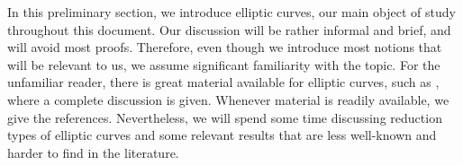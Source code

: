
In this preliminary section, we introduce elliptic curves, our main object of study throughout this document. Our discussion will be rather informal and brief, and will avoid most proofs. Therefore, even though we introduce most notions that will be relevant to us, we assume significant familiarity with the topic. For the unfamiliar reader, there is great material available for elliptic curves, such as \cite{S1}, where a complete discussion is given. Whenever material is readily available, we give the references. Nevertheless, we will spend some time discussing reduction types of elliptic curves and some relevant results that are less well-known and harder to find in the literature. 



